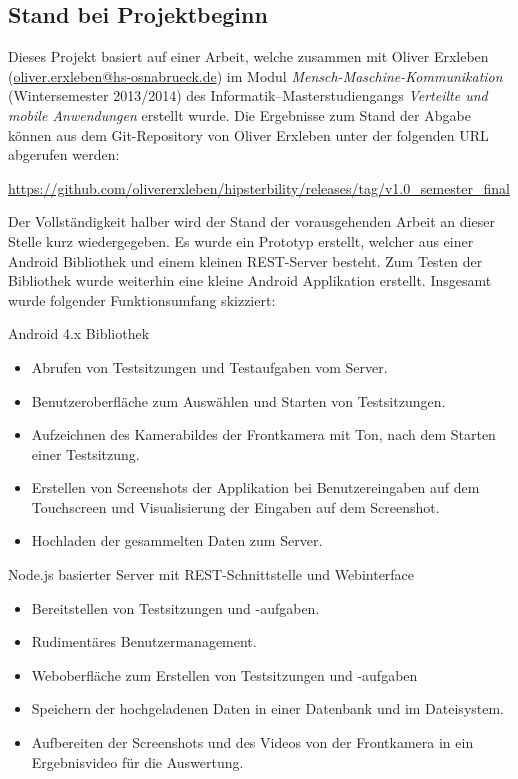 \subsection{Stand bei Projektbeginn\label{subsec:stand_bei_projektbeginn}}
Dieses Projekt basiert auf einer Arbeit, welche zusammen mit Oliver Erxleben (\href{mailto:oliver.erxleben@hs-osnabrueck.de}{oliver.erxleben@hs-osnabrueck.de}) im Modul \emph{Mensch-Maschine-Kommunikation} (Wintersemester 2013/2014) des Informatik--Masterstudiengangs \emph{Verteilte und mobile Anwendungen} erstellt wurde.
Die Ergebnisse zum Stand der Abgabe können aus dem Git-Repository von Oliver Erxleben unter der folgenden \ac{URL} abgerufen werden:

\url{https://github.com/olivererxleben/hipsterbility/releases/tag/v1.0_semester_final}

Der Vollständigkeit halber wird der Stand der vorausgehenden Arbeit an dieser Stelle kurz wiedergegeben.
Es wurde ein Prototyp erstellt, welcher aus einer Android Bibliothek und einem kleinen \ac{REST}-Server besteht.
Zum Testen der Bibliothek wurde weiterhin eine kleine Android Applikation erstellt.
Insgesamt wurde folgender Funktionsumfang skizziert:
\begin{compactitem}
	\item Android 4.x Bibliothek
	\begin{itemize}
		\item Abrufen von Testsitzungen und Testaufgaben vom Server.
		\item Benutzeroberfläche zum Auswählen und Starten von Testsitzungen.
		\item Aufzeichnen des Kamerabildes der Frontkamera mit Ton, nach dem Starten einer Testsitzung.
		\item Erstellen von Screenshots der Applikation bei Benutzereingaben auf dem Touchscreen und Visualisierung der Eingaben auf dem Screenshot.
		\item Hochladen der gesammelten Daten zum Server.
	\end{itemize}
	\item Node.js basierter Server mit REST-Schnittstelle und Webinterface
	\begin{itemize}
		\item Bereitstellen von Testsitzungen und -aufgaben.
		\item Rudimentäres Benutzermanagement.
		\item Weboberfläche zum Erstellen von Testsitzungen und -aufgaben
		\item Speichern der hochgeladenen Daten in einer Datenbank und im Dateisystem.
		\item Aufbereiten der Screenshots und des Videos von der Frontkamera in ein Ergebnisvideo für die Auswertung.
	\end{itemize}
\end{compactitem}

